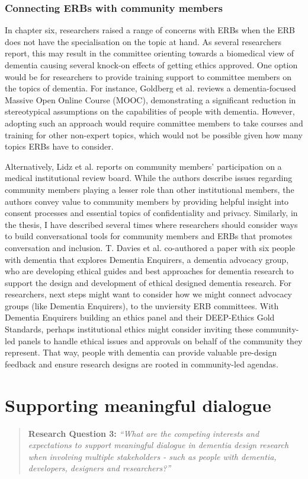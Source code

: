 \subsubsection{Connecting ERBs with community members}
\label{ERBs-Community-Members}
In chapter six, researchers raised a range of concerns with ERBs when the ERB does not have the specialisation on the topic at hand. As several researchers report, this may result in the committee orienting towards a biomedical view of dementia causing several knock-on effects of getting ethics approved. One option would be for researchers to provide training support to committee members on the topics of dementia. For instance, Goldberg et al. reviews a dementia-focused Massive Open Online Course (MOOC), demonstrating a significant reduction in stereotypical assumptions on the capabilities of people with dementia. However, adopting such an approach would require committee members to take courses and training for other non-expert topics, which would not be possible given how many topics ERBs have to consider. 

Alternatively, Lidz et al. reports on community members' participation on a medical institutional review board. While the authors describe issues regarding community members playing a lesser role than other institutional members, the authors convey value to community members by providing helpful insight into consent processes and essential topics of confidentiality and privacy. Similarly, in the thesis, I have described several times where researchers should consider ways to build conversational tools for community members and ERBs that promotes conversation and inclusion. T. Davies et al. co-authored a paper with six people with dementia that explores Dementia Enquirers, a dementia advocacy group, who are developing ethical guides and best approaches for dementia research to support the design and development of ethical designed dementia research. For researchers, next steps might want to consider how we might connect advocacy groups (like Dementia Enquirers), to the unviersity ERB committees. With Dementia Enquirers building an ethics panel and their DEEP-Ethics Gold Standards, perhaps institutional ethics might consider inviting these community-led panels to handle ethical issues and approvals on behalf of the community they represent. That way, people with dementia can provide valuable pre-design feedback and ensure research designs are rooted in community-led agendas. 



\section{Supporting meaningful dialogue}
\label{Discussion:RQ3}
\begin{quote}
\textbf{    Research Question 3:
}    
\textit{ “What are the competing interests and expectations to support meaningful dialogue in dementia design research when involving multiple stakeholders - such as people with dementia, developers, designers and researchers?”}
\end{quote}







